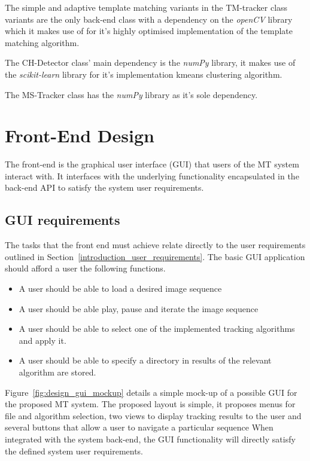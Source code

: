 The simple and adaptive template matching variants in the TM-tracker class variants are the only
back-end class with a dependency on the \textit{openCV} library which it makes use of for it's
highly optimised implementation of the template matching algorithm.

The CH-Detector class' main dependency is the \textit{numPy} library, it makes
use of the \textit{scikit-learn} library for it's implementation kmeans clustering
algorithm.

The MS-Tracker class has the \textit{numPy} library as it's sole dependency.

\section{Front-End Design}
The front-end is the graphical user interface (GUI) that users of the MT
system interact with. 
It interfaces with the underlying functionality encapsulated in the back-end API to
satisfy the system user requirements. 

\subsection{GUI requirements}
The tasks that the front end must achieve relate directly to the user
requirements outlined in Section~\ref{introduction_user_requirements}. The basic
GUI application should afford a user the following functions.  

\begin{itemize}
    \item A user should be able to load a desired image sequence
    \item A user should be able play, pause and iterate the image sequence 
    \item A user should be able to select one of the implemented tracking
        algorithms and apply it.
    \item A user should be able to specify a directory in results of the
        relevant algorithm are stored.
\end{itemize}

Figure~\ref{fig:design_gui_mockup} details a simple mock-up of a possible GUI
for the proposed MT system. The proposed layout is simple, it proposes menus for
file and algorithm selection, two views to display tracking results to the user
and several buttons that allow a user to navigate a particular sequence
When integrated with the system back-end, the GUI functionality will directly
satisfy the defined system user requirements.

